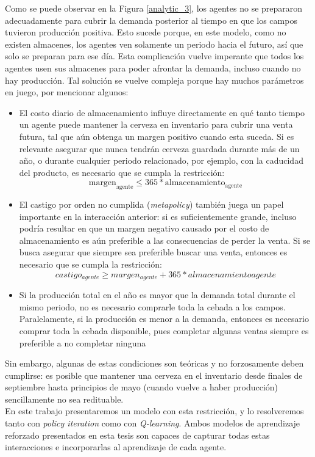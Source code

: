 Como se puede observar en la Figura \ref{analytic_3}, los agentes no se prepararon adecuadamente para cubrir la demanda posterior al tiempo en que los campos tuvieron producci\'on positiva. Esto sucede porque, en este modelo, como no existen almacenes, los agentes ven solamente un periodo hacia el futuro, as\'i que solo se preparan para ese d\'ia. Esta complicaci\'on vuelve imperante que todos los agentes usen sus almacenes para poder afrontar la demanda, incluso cuando no hay producci\'on. Tal soluci\'on se vuelve compleja porque hay muchos par\'ametros en juego, por mencionar algunos:
\begin{itemize}
    \item El costo diario de almacenamiento influye directamente en qu\'e tanto tiempo un agente puede mantener la cerveza en inventario para cubrir una venta futura, tal que a\'un obtenga un margen positivo cuando esta suceda. Si es relevante asegurar que nunca tendr\'an cerveza guardada durante m\'as de un a\~no, o durante cualquier periodo relacionado, por ejemplo, con la caducidad del producto, es necesario que se cumpla la restricci\'on:
    $$
    \text{margen}_{\text{agente}} \leq 365*\text{almacenamiento}_{\text{agente}}
    $$
    \item El castigo por orden no cumplida (\textit{metapolicy}) tambi\'en juega un papel importante en la interacci\'on anterior: si es suficientemente grande, incluso podr\'ia resultar en que un margen negativo causado por el costo de almacenamiento es a\'un preferible a las consecuencias de perder la venta. Si se busca asegurar que siempre sea preferible buscar una venta, entonces es necesario que se cumpla la restricci\'on:
    $$
    castigo_{agente} \geq margen_{agente} + 365*almacenamiento{agente}
    $$
    \item Si la producci\'on total en el a\~no es mayor que la demanda total durante el mismo periodo, no es necesario comprarle toda la cebada a los campos. Paralelamente, si la producci\'on es menor a la demanda, entonces es necesario comprar toda la cebada disponible, pues completar algunas ventas siempre es preferible a no completar ninguna
\end{itemize}

Sin embargo, algunas de estas condiciones son te\'oricas y no forzosamente deben cumplirse: es posible que mantener una cerveza en el inventario desde finales de septiembre hasta principios de mayo (cuando vuelve a haber producci\'on) sencillamente no sea redituable. \\

En este trabajo presentaremos un modelo con esta restricci\'on, y lo resolveremos tanto con \textit{policy iteration} como con \textit{Q-learning}. Ambos modelos de aprendizaje reforzado presentados en esta tesis son capaces de capturar todas estas interacciones e incorporarlas al aprendizaje de cada agente.
